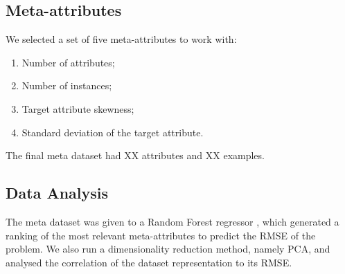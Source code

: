 

\subsection{Meta-attributes}

We selected a set of five meta-attributes to work with:
\begin{enumerate}
\item Number of attributes;
\item Number of instances; 
\item Target attribute skewness;
\item Standard deviation of the target attribute.
\end{enumerate}

The final meta dataset had XX attributes and XX examples.


\subsection{Data Analysis}

The meta dataset was given to a Random Forest regressor \cite{}, which generated a ranking of the most relevant meta-attributes to predict the RMSE of the problem.
We also run a dimensionality reduction method, namely PCA, and analysed the correlation of the dataset representation to its RMSE.
